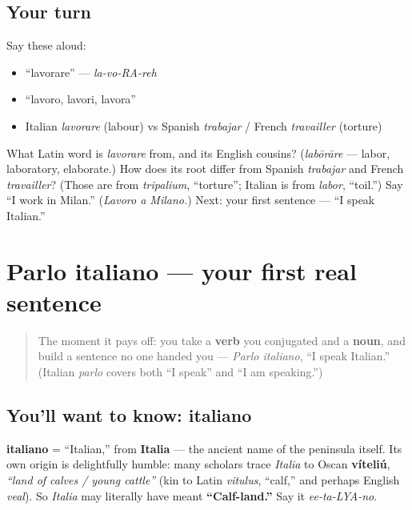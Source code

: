 \subsection*{Your turn}
Say these aloud:

\begin{itemize}
\raggedright
  \item \textquotedblleft{}lavorare\textquotedblright{} — \emph{la-vo-RA-reh}
  \item \textquotedblleft{}lavoro, lavori, lavora\textquotedblright{}
  \item Italian \emph{lavorare} (labour) vs Spanish \emph{trabajar} / French \emph{travailler} (torture)
\end{itemize}

\begin{tcolorbox}[breakable,colback=teal!4,colframe=teal!35!black,title={Before you move on}]
What Latin word is \emph{lavorare} from, and its English cousins? (\emph{labōrāre} — labor, laboratory, elaborate.) How does its root differ from Spanish \emph{trabajar} and French \emph{travailler}? (Those are from \emph{tripalium}, \textquotedblleft{}torture\textquotedblright{}; Italian is from \emph{labor}, \textquotedblleft{}toil.\textquotedblright{}) Say \textquotedblleft{}I work in Milan.\textquotedblright{} (\emph{Lavoro a Milano.}) Next: your first sentence — \textquotedblleft{}I speak Italian.\textquotedblright{}
\end{tcolorbox}
\section[Parlo italiano]{Parlo italiano — your first real sentence}

\label{lesson:IT-C05-parlo-italiano}



\begin{quote}
The moment it pays off: you take a \textbf{verb} you conjugated and a \textbf{noun}, and build a sentence no one handed you — \emph{Parlo italiano}, \textquotedblleft{}I speak Italian.\textquotedblright{} (Italian \emph{parlo} covers both \textquotedblleft{}I speak\textquotedblright{} and \textquotedblleft{}I am speaking.\textquotedblright{})
\end{quote}

\subsection*{You'll want to know: italiano}
\textbf{italiano} = \textquotedblleft{}Italian,\textquotedblright{} from \textbf{Italia} — the ancient name of the peninsula itself. Its own origin is delightfully humble: many scholars trace \emph{Italia} to Oscan \textbf{víteliú}, \emph{\textquotedblleft{}land of calves / young cattle\textquotedblright{}} (kin to Latin \emph{vitulus}, \textquotedblleft{}calf,\textquotedblright{} and perhaps English \emph{veal}). So \emph{Italia} may literally have meant \textbf{\textquotedblleft{}Calf-land.\textquotedblright{}} Say it \emph{ee-ta-LYA-no}.

